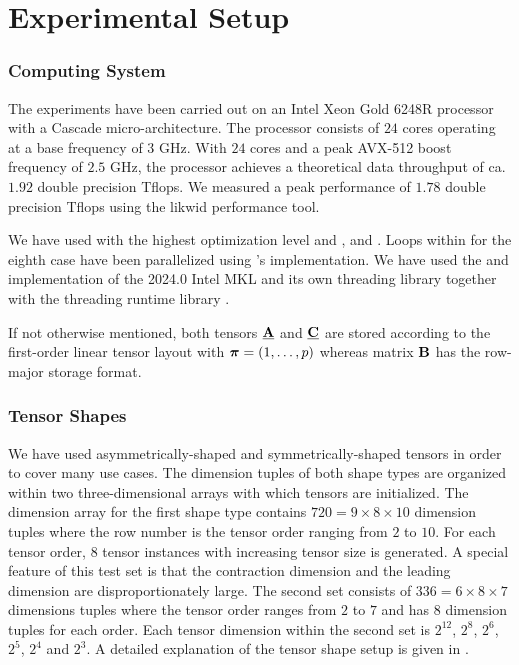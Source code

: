 \section{Experimental Setup}
\label{sec:experimental.setup}
\subsubsection{Computing System} 
The experiments have been carried out on an Intel Xeon Gold 6248R processor with a Cascade micro-architecture. The processor consists of $24$ cores operating at a base frequency of $3$ GHz.
With $24$ cores and a peak AVX-512 boost frequency of $2.5$ GHz, the processor achieves a theoretical data throughput of ca. $1.92$ double precision Tflops.
We measured a peak performance of $1.78$ double precision Tflops using the likwid performance tool.

We have used   with the highest optimization level  and ,  and . 
Loops within for the eighth case have been parallelized using 's   implementation.
We have used the  and  implementation of the 2024.0 Intel MKL and its own threading library  together with the threading runtime library .

If not otherwise mentioned, both tensors $\underline{\mathbf{A}}$ and $\underline{\mathbf{C}}$ are stored according to the first-order linear tensor layout with $\boldsymbol{\pi} = (1,\dots,p)$ whereas matrix $\mathbf{B}$ has the row-major storage format.
\vspace{-1em}

\subsubsection{Tensor Shapes} 
We have used asymmetrically-shaped and symmetrically-shaped tensors in order to cover many use cases. 
The dimension tuples of both shape types are organized within two three-dimensional arrays with which tensors are initialized.
The dimension array for the first shape type contains $720 = 9\times 8 \times 10$ dimension tuples where the row number is the tensor order ranging from $2$ to $10$. 
For each tensor order, $8$ tensor instances with increasing tensor size is generated.
A special feature of this test set is that the contraction dimension and the leading dimension are disproportionately large. 
The second set consists of $336 = 6\times8\times 7$ dimensions tuples where the tensor order ranges from $2$ to $7$ and has $8$ dimension tuples for each order.
Each tensor dimension within the second set is $2^{12}$, $2^{8}$, $2^{6}$, $2^5$, $2^4$ and $2^3$.
A detailed explanation of the tensor shape setup is given in \cite{bassoy:2019:ttv, bassoy:2018:fast}.